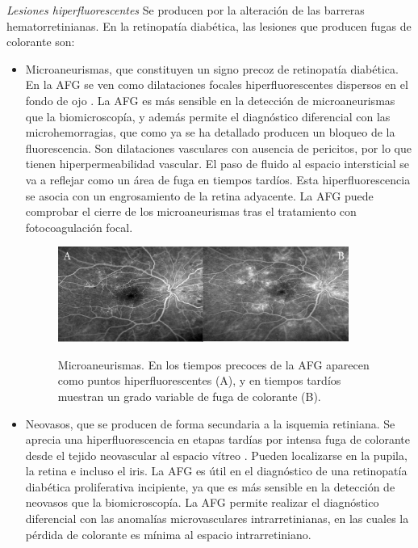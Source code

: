  \textit{Lesiones hiperfluorescentes}
Se producen por la alteración de las barreras hematorretinianas. En la retinopatía diabética, las lesiones que producen fugas de colorante son:
\begin{itemize}
\item Microaneurismas, que constituyen un signo precoz de retinopatía diabética. En la AFG se ven como dilataciones focales hiperfluorescentes dispersos en el fondo de ojo . La AFG es más sensible en la detección de microaneurismas que la biomicroscopía, y además permite el diagnóstico diferencial con las microhemorragias, que como ya se ha detallado producen un bloqueo de la fluorescencia. Son dilataciones vasculares con ausencia de pericitos, por lo que tienen hiperpermeabilidad vascular. El paso de fluido al espacio intersticial se va a reflejar como un área de fuga en tiempos tardíos. Esta hiperfluorescencia se asocia con un engrosamiento de la retina adyacente. La AFG puede comprobar el cierre de los microaneurismas tras el tratamiento con fotocoagulación focal.

\begin{figure}[H]
\centering
\includegraphics[width=0.9\textwidth]{./Figures/AF_HIPERFLUORECINA.png}
\label{fig:lightfilter}
\caption{Microaneurismas. En los tiempos precoces de la AFG aparecen como puntos hiperfluorescentes (A), y en tiempos tardíos muestran un grado variable de fuga de colorante (B).}
\end{figure}


\item Neovasos, que se producen de forma secundaria a la isquemia retiniana. Se aprecia una hiperfluorescencia en etapas tardías por
intensa fuga de colorante desde el tejido neovascular al espacio vítreo . Pueden localizarse en la pupila, la retina e incluso
el iris. La AFG es útil en el diagnóstico de una retinopatía diabética proliferativa incipiente, ya que es más sensible en la detección de neovasos que la biomicroscopía. La AFG permite realizar el diagnóstico diferencial con las anomalías microvasculares intrarretinianas, en las cuales la pérdida de colorante es mínima al espacio intrarretiniano.
\end{itemize}


